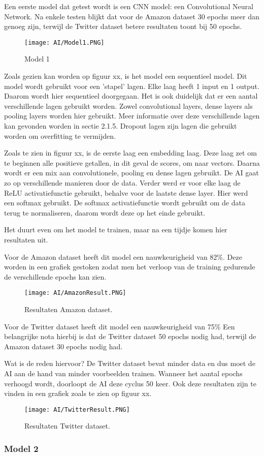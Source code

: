 Een eerste model dat getest wordt is een CNN model: een Convolutional Neural Network. Na enkele testen blijkt dat voor de Amazon dataset 30 epochs meer dan genoeg zijn, terwijl de Twitter dataset betere resultaten toont bij 50 epochs.
\begin{figure}[!htbp]
    \texttt{[image: AI/Model1.PNG]}
    \caption{\label{model1}Model 1}
\end{figure}
\FloatBarrier

Zoals gezien kan worden op figuur xx, is het model een sequentieel model. Dit model wordt gebruikt voor een 'stapel' lagen. Elke laag heeft 1 input en 1 output. Daarom wordt hier sequentieel doorgegaan. Het is ook duidelijk dat er een aantal verschillende lagen gebruikt worden. Zowel convolutional layers, dense layers als pooling layers worden hier gebruikt. Meer informatie over deze verschillende lagen kan gevonden worden in sectie 2.1.5. Dropout lagen zijn lagen die gebruikt worden om overfitting te vermijden. 

Zoals te zien in figuur xx, is de eerste laag een embedding laag. Deze laag zet om te beginnen alle positieve getallen, in dit geval de scores, om naar vectors. Daarna wordt er een mix aan convolutionele, pooling en dense lagen gebruikt. De AI gaat zo op verschillende manieren door de data. Verder werd er voor elke laag de ReLU activatiefunctie gebruikt, behalve voor de laatste dense layer. Hier werd een softmax gebruikt. De softmax activatiefunctie wordt gebruikt om de data terug te normaliseren, daarom wordt deze op het einde gebruikt.   

Het duurt even om het model te trainen, maar na een tijdje komen hier resultaten uit. 

Voor de Amazon dataset heeft dit model een nauwkeurigheid van 82\%. Deze worden in een grafiek gestoken zodat men het verloop van de training gedurende de verschillende epochs kan zien. 

\begin{figure}[!htbp]
    \texttt{[image: AI/AmazonResult.PNG]}
    \caption{\label{amazonresult}Resultaten Amazon dataset.}
\end{figure}
\FloatBarrier

Voor de Twitter dataset heeft dit model een nauwkeurigheid van 75\%
Een belangrijke nota hierbij is dat de Twitter dataset 50 epochs nodig had, terwijl de Amazon dataset 30 epochs nodig had.

Wat is de reden hiervoor?
De Twitter dataset bevat minder data en dus moet de AI aan de hand van minder voorbeelden trainen. Wanneer het aantal epochs verhoogd wordt, doorloopt de AI deze cyclus 50 keer. 
Ook deze resultaten zijn te vinden in een grafiek zoals te zien op figuur xx. 

\begin{figure}[!htbp]
    \texttt{[image: AI/TwitterResult.PNG]}
    \caption{\label{twitterresult}Resultaten Twitter dataset.}
\end{figure}
\FloatBarrier

\subsubsection{Model 2}

